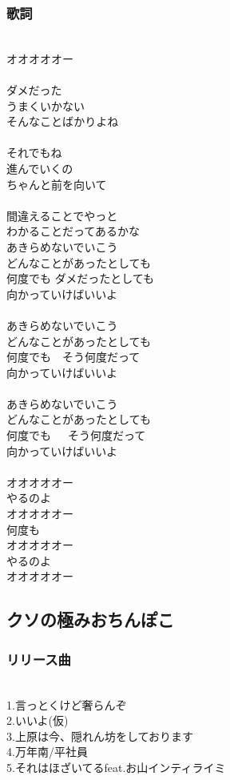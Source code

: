 \documentclass[12pt]{jsarticle}
\begin{document}
\subsubsection{歌詞}
\ \\ 
オオオオオー\\
\\
ダメだった\\
うまくいかない\\
そんなことばかりよね\\
\\
それでもね\\
進んでいくの\\
ちゃんと前を向いて\\
\\
間違えることでやっと\\
わかることだってあるかな\\
あきらめないでいこう\\
どんなことがあったとしても\\
何度でも ダメだったとしても\\
向かっていけばいいよ\\
\\
あきらめないでいこう\\
どんなことがあったとしても\\
何度でも　そう何度だって\\
向かっていけばいいよ\\
\\
あきらめないでいこう\\
どんなことがあったとしても\\
何度でも　\ そう何度だって\\
向かっていけばいいよ\\
 \\
オオオオオー\\
やるのよ\\
オオオオオー\\
何度も\\
オオオオオー\\
やるのよ\\
オオオオオー\\

\subsection{クソの極みおちんぽこ}
\subsubsection{リリース曲}
　\\
1.言っとくけど奢らんぞ\\
2.いいよ(仮)\\
3.上原は今、隠れん坊をしております\\
4.万年南/平社員\\
5.それはほざいてるfeat.お山インティライミ\\
\end{document}

